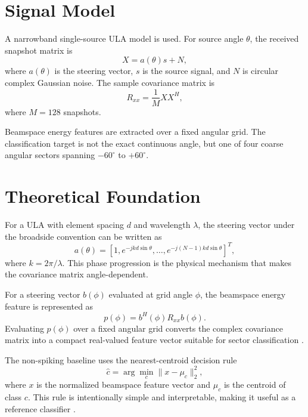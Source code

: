 \documentclass[conference]{IEEEtran}
\begin{document}
\section{Signal Model}

A narrowband single-source ULA model is used. For source angle $\theta$, the received snapshot matrix is
\begin{equation}
    X = a(\theta)s + N,
\end{equation}
where $a(\theta)$ is the steering vector, $s$ is the source signal, and $N$ is circular complex Gaussian noise. The sample covariance matrix is
\begin{equation}
    R_{xx}=\frac{1}{M}XX^{H},
\end{equation}
where $M=128$ snapshots.

Beamspace energy features are extracted over a fixed angular grid. The classification target is not the exact continuous angle, but one of four coarse angular sectors spanning $-60^{\circ}$ to $+60^{\circ}$.

\section{Theoretical Foundation}

For a ULA with element spacing $d$ and wavelength $\lambda$, the steering vector under the broadside convention can be written as \cite{vantrees}
\begin{equation}
    a(\theta)=
    [1,e^{-jkd\sin\theta},\ldots,e^{-j(N-1)kd\sin\theta}]^{T},
\end{equation}
where $k=2\pi/\lambda$. This phase progression is the physical mechanism that makes the covariance matrix angle-dependent.

For a steering vector $b(\phi)$ evaluated at grid angle $\phi$, the beamspace energy feature is represented as
\begin{equation}
    p(\phi)=b^{H}(\phi)R_{xx}b(\phi).
\end{equation}
Evaluating $p(\phi)$ over a fixed angular grid converts the complex covariance matrix into a compact real-valued feature vector suitable for sector classification \cite{vantrees,haykin}.

The non-spiking baseline uses the nearest-centroid decision rule
\begin{equation}
    \hat{c}=\arg\min_c \lVert x-\mu_c\rVert_2^2,
\end{equation}
where $x$ is the normalized beamspace feature vector and $\mu_c$ is the centroid of class $c$. This rule is intentionally simple and interpretable, making it useful as a reference classifier \cite{duda}.
\end{document}
